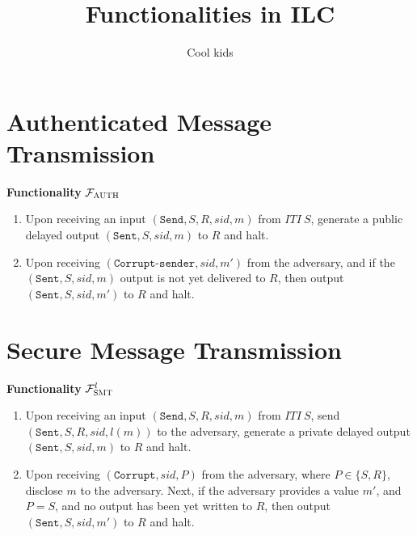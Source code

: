 \documentclass[a4paper]{article}
\newcommand{\F}{\mathcal{F}}
\begin{document}
\title{Functionalities in ILC}
\author{Cool kids}
\date{}
\maketitle

\section{Authenticated Message Transmission}

\begin{framed}
    \centerline{\textbf{Functionality} $\F_{\textsc{AUTH}}$}
    \begin{enumerate}
        \item Upon receiving an input $(\texttt{Send}, S, R, sid, m)$ from $ITI\ S$, generate a public delayed output $(\texttt{Sent}, S, sid, m)$ to $R$ and halt.
        \item Upon receiving $(\texttt{Corrupt-sender}, sid, m')$ from the adversary, and if the $(\texttt{Sent}, S, sid, m)$ output is not yet delivered to $R$, then output $(\texttt{Sent}, S, sid, m')$ to $R$ and halt.
    \end{enumerate}
\end{framed}



\section{Secure Message Transmission}

\begin{framed}
    \centerline{\textbf{Functionality} $\F^l_{\textsc{SMT}}$}
    \begin{enumerate}
        \item Upon receiving an input $(\texttt{Send}, S, R, sid, m)$ from $ITI\ S$, send $(\texttt{Sent}, S, R, sid, l(m))$ to the adversary, generate a private delayed output $(\texttt{Sent}, S, sid, m)$ to $R$ and halt.
        \item Upon receiving $(\texttt{Corrupt}, sid, P)$ from the adversary, where $P \in \{S,R\}$, disclose $m$ to the adversary. Next, if the adversary provides a value $m'$, and $P = S$, and no output has been yet written to $R$, then output $(\texttt{Sent}, S, sid, m')$ to $R$ and halt.
    \end{enumerate}
\end{framed}


\end{document}
